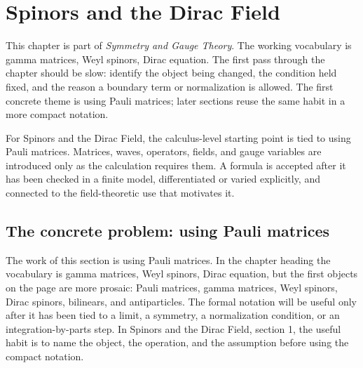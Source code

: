 \chapter{Spinors and the Dirac Field}


This chapter is part of \emph{Symmetry and Gauge Theory}.  The working vocabulary is gamma matrices, Weyl spinors, Dirac equation.  The first pass through the chapter should be slow: identify the object being changed, the condition held fixed, and the reason a boundary term or normalization is allowed.  The first concrete theme is using Pauli matrices; later sections reuse the same habit in a more compact notation.

For Spinors and the Dirac Field, the calculus-level starting point is tied to using Pauli matrices.  Matrices, waves, operators, fields, and gauge variables are introduced only as the calculation requires them.  A formula is accepted after it has been checked in a finite model, differentiated or varied explicitly, and connected to the field-theoretic use that motivates it.

\section{The concrete problem: using Pauli matrices}













The work of this section is using Pauli matrices.  In the chapter heading the vocabulary is gamma matrices, Weyl spinors, Dirac equation, but the first objects on the page are more prosaic: Pauli matrices, gamma matrices, Weyl spinors, Dirac spinors, bilinears, and antiparticles.  The formal notation will be useful only after it has been tied to a limit, a symmetry, a normalization condition, or an integration-by-parts step.  In Spinors and the Dirac Field, section 1, the useful habit is to name the object, the operation, and the assumption before using the compact notation.

